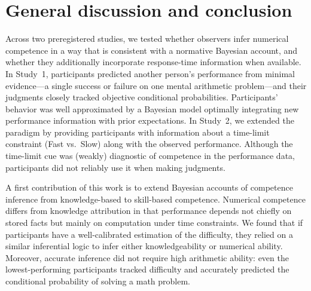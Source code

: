 \documentclass[10pt,letterpaper]{article}
\begin{document}
\section{General discussion and conclusion}\label{general-discussion-and-conclusion}

Across two preregistered studies, we tested whether observers infer numerical competence in a way that is consistent with a normative Bayesian account, and whether they additionally incorporate response-time information when available. In Study~1, participants predicted another person’s performance from minimal evidence---a single success or failure on one mental arithmetic problem---and their judgments closely tracked objective conditional probabilities. Participants' behavior was well approximated by a Bayesian model optimally integrating new performance information with prior expectations. In Study~2, we extended the paradigm by providing participants with information about a time-limit constraint (Fast vs.\ Slow) along with the observed performance. Although the time-limit cue was (weakly) diagnostic of competence in the performance data, participants did not reliably use it when making judgments.

A first contribution of this work is to extend Bayesian accounts of competence inference from knowledge-based \citep[e.g.][]{Aboody-2025,Mercier-2026} to skill-based competence. Numerical competence differs from knowledge attribution in that performance depends not chiefly on stored facts but mainly on computation under time constraints. We found that if participants have a well-calibrated estimation of the difficulty, they relied on a similar inferential logic to infer     either knowledgeability or numerical ability. Moreover, accurate inference did not require high arithmetic ability: even the lowest-performing participants tracked difficulty and accurately predicted the conditional probability of solving a math problem.
\end{document}
